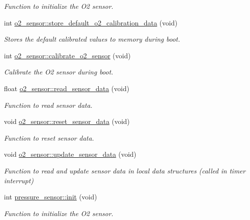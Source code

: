 \begin{DoxyCompactItemize}
\begin{DoxyCompactList}\small\item\em Function to initialize the O2 sensor. \end{DoxyCompactList}\item 
int \hyperlink{group___ventilator_module_gabdf47205921998912383bd108cc1c417}{o2\+\_\+sensor\+::store\+\_\+default\+\_\+o2\+\_\+calibration\+\_\+data} (void)
\begin{DoxyCompactList}\small\item\em Stores the default calibrated values to memory during boot. \end{DoxyCompactList}\item 
int \hyperlink{group___ventilator_module_gaec727276605d9fef106d5115f711c037}{o2\+\_\+sensor\+::calibrate\+\_\+o2\+\_\+sensor} (void)
\begin{DoxyCompactList}\small\item\em Calibrate the O2 sensor during boot. \end{DoxyCompactList}\item 
float \hyperlink{group___ventilator_module_ga9601927ed36f205bdc9a8dfb55cf9657}{o2\+\_\+sensor\+::read\+\_\+sensor\+\_\+data} (void)
\begin{DoxyCompactList}\small\item\em Function to read sensor data. \end{DoxyCompactList}\item 
void \hyperlink{group___ventilator_module_gacc2551ecc6e2b9542a747aed535eda43}{o2\+\_\+sensor\+::reset\+\_\+sensor\+\_\+data} (void)
\begin{DoxyCompactList}\small\item\em Function to reset sensor data. \end{DoxyCompactList}\item 
void \hyperlink{group___ventilator_module_ga460fc40d059c217fa41e4539cdb3c11d}{o2\+\_\+sensor\+::update\+\_\+sensor\+\_\+data} (void)
\begin{DoxyCompactList}\small\item\em Function to read and update sensor data in local data structures (called in timer interrupt) \end{DoxyCompactList}\item 
int \hyperlink{group___ventilator_module_ga12b267b360a27d82a85f0b5276d433ed}{pressure\+\_\+sensor\+::init} (void)
\begin{DoxyCompactList}\small\item\em Function to initialize the O2 sensor. \end{DoxyCompactList}\item 

\end{DoxyCompactItemize}
